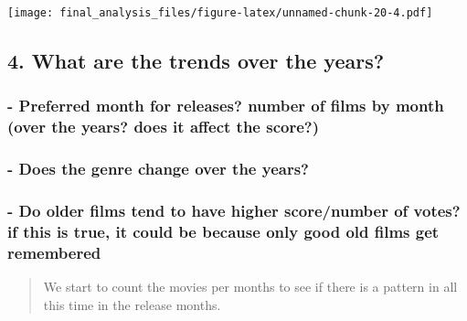 \documentclass[]{article}
\begin{document}
\texttt{[image: final\_analysis\_files/figure-latex/unnamed-chunk-20-4.pdf]}

\hypertarget{what-are-the-trends-over-the-years-1}{%
\subsection{4. What are the trends over the
years?}\label{what-are-the-trends-over-the-years-1}}

\hypertarget{preferred-month-for-releases-number-of-films-by-month-over-the-years-does-it-affect-the-score}{%
\subsubsection{- Preferred month for releases? number of films by month
(over the years? does it affect the
score?)}\label{preferred-month-for-releases-number-of-films-by-month-over-the-years-does-it-affect-the-score}}

\hypertarget{does-the-genre-change-over-the-years}{%
\subsubsection{- Does the genre change over the
years?}\label{does-the-genre-change-over-the-years}}

\hypertarget{do-older-films-tend-to-have-higher-scorenumber-of-votes-if-this-is-true-it-could-be-because-only-good-old-films-get-remembered}{%
\subsubsection{- Do older films tend to have higher score/number of
votes? if this is true, it could be because only good old films get
remembered}\label{do-older-films-tend-to-have-higher-scorenumber-of-votes-if-this-is-true-it-could-be-because-only-good-old-films-get-remembered}}

\begin{quote}
We start to count the movies per months to see if there is a pattern in
all this time in the release months.
\end{quote}
\end{document}
